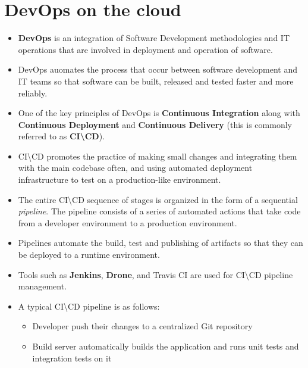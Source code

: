 \documentclass{article}
\begin{document}
\section{DevOps on the cloud}
\begin{itemize}
    \item \textbf{DevOps} is an integration of Software Development methodologies and IT operations that are involved in deployment and operation of software. 
    
    \item DevOps auomates the process that occur between software development and IT teams so that software can be built, released and tested faster and more reliably. 
    
    \item One of the key principles of DevOps is \textbf{Continuous Integration} along with \textbf{Continuous Deployment} and \textbf{Continuous Delivery} (this is commonly referred to as \textbf{CI\textbackslash CD}). 
    
    \item CI\textbackslash CD promotes the practice of making small changes and integrating them with the main codebase often, and using automated deployment infrastructure to test on a production-like environment. 
    
    \item The entire CI\textbackslash CD sequence of stages is organized in the form of a sequential \textit{pipeline}. The pipeline consists of a series of automated actions that take code from a developer environment to a production environment. 
    
    \item Pipelines automate the build, test and publishing of artifacts so that they can be deployed to a runtime environment.
    
    \item Tools such as \textbf{Jenkins}, \textbf{Drone}, and Travis CI are used for CI\textbackslash CD pipeline management. 
    
    \item A typical CI\textbackslash CD pipeline is as follows:
    \begin{itemize}
        \item Developer push their changes to a centralized Git repository
        
        \item Build server automatically builds the application and runs unit tests and integration tests on it
        

\end{itemize}
\end{itemize}
\end{document}
